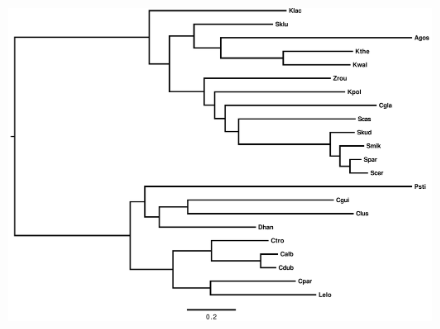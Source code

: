 \documentclass[12pt,draft]{article}
\begin{document}
\begin{figure}[H]
    \centering
	\includegraphics[width=.4\textwidth]{img/rokas_noBay_RAxML_bestTree_rooted.pdf}
    \caption{}
    \label{fig:tree_yeast}
\end{figure}
\end{document}
